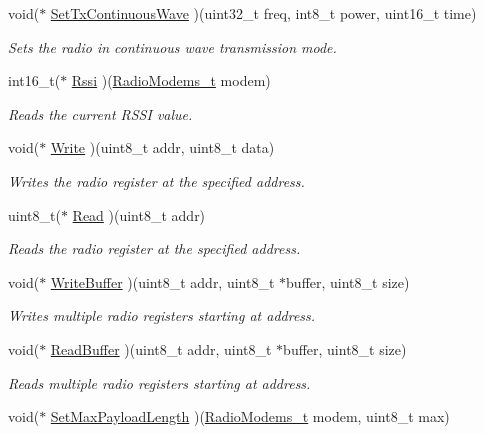 \begin{DoxyCompactItemize}
void($\ast$ \hyperlink{group__LORA_ga6b20fa3f6908c0165b26d8e02b944e3b}{Set\+Tx\+Continuous\+Wave} )(uint32\+\_\+t freq, int8\+\_\+t power, uint16\+\_\+t time)
\begin{DoxyCompactList}\small\item\em Sets the radio in continuous wave transmission mode. \end{DoxyCompactList}\item 
int16\+\_\+t($\ast$ \hyperlink{group__LORA_gade038967fa33e964e02fe10e66d6d510}{Rssi} )(\hyperlink{group__LORA_ga992ef7a5b7f52975ba7bd8dd97740057}{Radio\+Modems\+\_\+t} modem)
\begin{DoxyCompactList}\small\item\em Reads the current R\+S\+SI value. \end{DoxyCompactList}\item 
void($\ast$ \hyperlink{group__LORA_ga5f0ca54e8bc3c82d3c9b196230c325d5}{Write} )(uint8\+\_\+t addr, uint8\+\_\+t data)
\begin{DoxyCompactList}\small\item\em Writes the radio register at the specified address. \end{DoxyCompactList}\item 
uint8\+\_\+t($\ast$ \hyperlink{group__LORA_ga8396bca959a0b717fabd37ac91c11534}{Read} )(uint8\+\_\+t addr)
\begin{DoxyCompactList}\small\item\em Reads the radio register at the specified address. \end{DoxyCompactList}\item 
void($\ast$ \hyperlink{group__LORA_gab282c0d0a6bd7dd9f21cf79984988a8a}{Write\+Buffer} )(uint8\+\_\+t addr, uint8\+\_\+t $\ast$buffer, uint8\+\_\+t size)
\begin{DoxyCompactList}\small\item\em Writes multiple radio registers starting at address. \end{DoxyCompactList}\item 
void($\ast$ \hyperlink{group__LORA_ga7ef5175264a4cf10bb6d9fa40c115dab}{Read\+Buffer} )(uint8\+\_\+t addr, uint8\+\_\+t $\ast$buffer, uint8\+\_\+t size)
\begin{DoxyCompactList}\small\item\em Reads multiple radio registers starting at address. \end{DoxyCompactList}\item 
void($\ast$ \hyperlink{group__LORA_ga182fc8f265a2d02d64f3ee1c6dd5906f}{Set\+Max\+Payload\+Length} )(\hyperlink{group__LORA_ga992ef7a5b7f52975ba7bd8dd97740057}{Radio\+Modems\+\_\+t} modem, uint8\+\_\+t max)

\end{DoxyCompactItemize}
